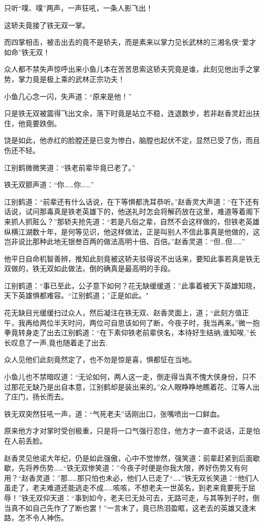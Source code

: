 \documentclass[12pt,oneside]{book}
\begin{document}
只听``噗、噗''两声，一声狂吼，一条人影飞出！

这轿夫竟接了铁无双一掌。

而四掌相击，被击出去的竟不是轿夫，而是素来以掌力见长武林的三湘名侠``爱才如命''铁无双！

众人都不禁失声惊呼出来小鱼儿本在苦苦思索这轿夫究竟是谁，此刻见他出手之掌势，掌力竟是极上乘的武林正宗功夫！

小鱼几心念一闪，失声道：``原来是他！''

只是铁无双被震得飞出文余，落下时竟是站立不稳，连退数步，若非赵香灵赶出扶住，他竟要跌倒。

饶是如此，他赤红的脸膛还是已变为惨白，脑膛也起伏不定，显然已受了伤，而且伤还不轻。

江别鹤微微笑道：``铁老前辈毕竟已老了。''

铁无双颤声道：``你\ldots\ldots 你\ldots\ldots{}''

江别鹤道：``前辈还有什么话说，在下等惧都洗耳恭听。''赵香灵大声道：``在下还有话说，试问那毒真是铁老英雄下的，他送礼时怎会将解药放在这里，难道等着阁下来抓人抓赃么？''那轿夫抢先道：``若是凡俗之辈，自然不会这样做的，但铁老英雄纵横江湖数十年，是何等见识，他这样做法，正是叫别人不信此事真是他做的，这岂非说比那种此地无银叁百两的做法高明十倍、百倍。''赵香灵道：``但\ldots 但\ldots\ldots{}''

他平日自命机智善辨，推知此刻竟被这轿夫驳得说不出话来，要知此事若真是铁无双做的，铁无双如此做法，倒的确真是最高明的手段。

江别鹤道：``事已至此，公子意下如何？花无缺缓缓道：''此事着被天下英雄知晓，天下英雄惧都难容。``江别鹤道；''正是如此。"

花无缺目光缓缓扫过众人，然后凝注在铁无双、赵香灵面上，道；``此刻方值正午，我再给两位半天时问，两位可自思该如何了断，今夜子时，我当再来。''微一抱拳竟转身走了出去江别鹤道：``在下素仰铁老前辈侠名，本待好生结纳,谁知唉,''长长叹息了一声,竟也随着走了出去.

众人见他们此刻竟然定了，也不勿是惊是喜，惧都怔在当地。

小鱼儿也不禁暗叹道：``无论如何，两人这一走，倒走得当真不愧大侠身份，只不过那花无缺乃是出自本意，江别鹤却是装出来的。''众人眼睁睁地瞧着花、江等人出了庄门，扬长而去。

铁无双突然狂吼一声，道：``气死老夫''话刚出口，张嘴喷出一口鲜血。

原来他方才对掌时受创极重，只是将一口气强行忍住，他方才一直不说话，正是怕在人前丢脸。

赵香灵见他诺大年纪，仍是如此强傲，心中不觉惨然，强笑道：前辈赶紧到后面歇歇，先将养伤势\ldots\ldots{}``铁无双惨笑道：''今夜子时便是你我大限，养好伤势又有何用？``赵香灵道：''那\ldots\ldots 那只怕也未必，他们人已走了``\ldots．''铁无双长笑道：``他们人虽走了，老夫难道还能逃走不成\ldots\ldots 咳咳，不想老夫一世英名，到老来竟要死于屈辱！''铁无双仰天道：``事到如今，老夫已无处可去，无路可走，与其等到子时，倒当真不如自己先作了了断也罢！''一言未了，竟已热泪盈眶，这老去的英雄又逢末路，怎不令人神伤。
\end{document}
